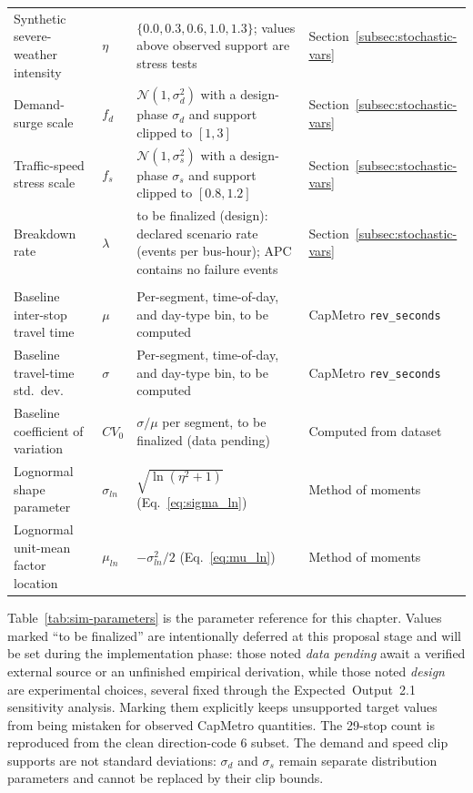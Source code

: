 \begin{table}[htbp]
\begin{tabularx}{\textwidth}{
>{\RaggedRight\arraybackslash}p{}
>{\RaggedRight\arraybackslash}p{}
X
>{\RaggedRight\arraybackslash}p{}
}
\midrule
\multicolumn{4}{l}{\textit{Swept / variable parameters}} \\
\midrule

Synthetic severe-weather intensity & $\eta$ & $\{0.0, 0.3, 0.6, 1.0, 1.3\}$; values above observed support are stress tests & Section~\ref{subsec:stochastic-vars} \\
Demand-surge scale & $f_d$ & $\mathcal{N}(1,\sigma_d^2)$ with a design-phase $\sigma_d$ and support clipped to $[1,3]$ & Section~\ref{subsec:stochastic-vars} \\
Traffic-speed stress scale & $f_s$ & $\mathcal{N}(1,\sigma_s^2)$ with a design-phase $\sigma_s$ and support clipped to $[0.8,1.2]$ & Section~\ref{subsec:stochastic-vars} \\
Breakdown rate & $\lambda$ & to be finalized (design): declared scenario rate (events per bus-hour); APC contains no failure events & Section~\ref{subsec:stochastic-vars} \\

\midrule
\multicolumn{4}{l}{\textit{Derived empirical/calibration parameters}} \\
\midrule

Baseline inter-stop travel time & $\mu$ & Per-segment, time-of-day, and day-type bin, to be computed & CapMetro \texttt{rev\_seconds} \\
Baseline travel-time std.\ dev.\ & $\sigma$ & Per-segment, time-of-day, and day-type bin, to be computed & CapMetro \texttt{rev\_seconds} \\
Baseline coefficient of variation & $CV_0$ & $\sigma/\mu$ per segment, to be finalized (data pending) & Computed from dataset \\
Lognormal shape parameter & $\sigma_{ln}$ & $\sqrt{\ln(\eta^2+1)}$ (Eq.~\ref{eq:sigma_ln}) & Method of moments \\
Lognormal unit-mean factor location & $\mu_{ln}$ & $-\sigma_{ln}^2/2$ (Eq.~\ref{eq:mu_ln}) & Method of moments \\

\bottomrule
\end{tabularx}
\end{table}

Table~\ref{tab:sim-parameters} is the parameter reference for this chapter. Values marked ``to be finalized'' are intentionally deferred at this proposal stage and will be set during the implementation phase: those noted \emph{data pending} await a verified external source or an unfinished empirical derivation, while those noted \emph{design} are experimental choices, several fixed through the Expected~Output~2.1 sensitivity analysis. Marking them explicitly keeps unsupported target values from being mistaken for observed CapMetro quantities. The 29-stop count is reproduced from the clean direction-code 6 subset. The demand and speed clip supports are not standard deviations: $\sigma_d$ and $\sigma_s$ remain separate distribution parameters and cannot be replaced by their clip bounds.


